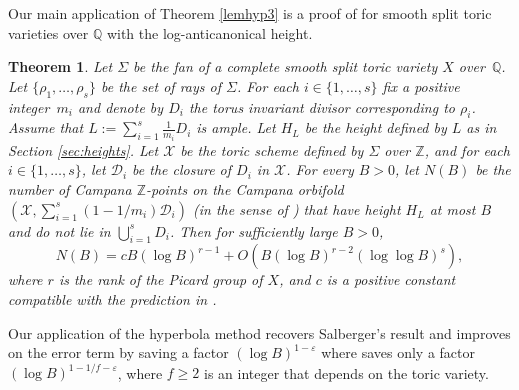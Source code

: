 \documentclass[11pt]{article}
\numberwithin{equation}{section}
\newcommand\ZZ{\mathbb{Z}}
\newcommand\QQ{\mathbb{Q}}
\newtheorem{theorem}{Theorem}
\theoremstyle{definition}
\numberwithin{theorem}{section}
\begin{document}
Our main application of Theorem \ref{lemhyp3} is a proof of \cite[Conj.\,1.1]{PSTVA} for smooth split toric varieties over $\QQ$ with the log-anticanonical height.
\begin{theorem}
\label{thm:toric}
Let $\Sigma$ be the fan of a complete smooth split toric variety $X$ over~$\QQ$. Let $\{\rho_1,\dots,\rho_s\}$ be the set of rays of $\Sigma$.
For each $i\in\{1,\dots,s\}$ fix a positive integer~$m_i$
and denote by $D_i$ the torus invariant divisor corresponding to $\rho_i$. Assume that $L:=\sum_{i=1}^s\frac 1{m_i} D_i$ is ample.
Let $H_L$ be the height defined by $L$ as in Section \ref{sec:heights}.
Let $\mathscr X$ be the toric scheme defined by $\Sigma$ over $\ZZ$, and for each $i\in\{1,\dots,s\}$, let $\mathscr D_i$ be the closure of $D_i$ in $\mathscr X$.
For every $B>0$, let $N(B)$ be the number of Campana $\ZZ$-points on the Campana orbifold $(\mathscr X, \sum_{i=1}^s(1-1/m_i)\mathscr D_i)$ (in the sense of \cite[Def.\,3.4]{PSTVA}) that have height $H_L$ at most $B$ and do not lie in $\bigcup_{i=1}^sD_i$.
Then for sufficiently large $B>0$,
\begin{equation}
\label{eq:mainthm_asympt}
N(B) = c B(\log B)^{r-1} + O(
B(\log B)^{r-2}(\log\log B)^{s}),
\end{equation}
where $r$ is the rank of the Picard group of $X$, and $c$ is a positive constant compatible with the prediction in \cite[\S3.3]{PSTVA}.
\end{theorem}
Our application of the hyperbola method recovers Salberger's result \cite{MR1679841} and improves on the error term by saving a factor $(\log B)^{1-\varepsilon}$ where \cite{MR1679841} saves only a factor $(\log B)^{1-1/f-\varepsilon}$, where $f\geq 2$ is an integer that depends on the toric variety.
\end{document}
